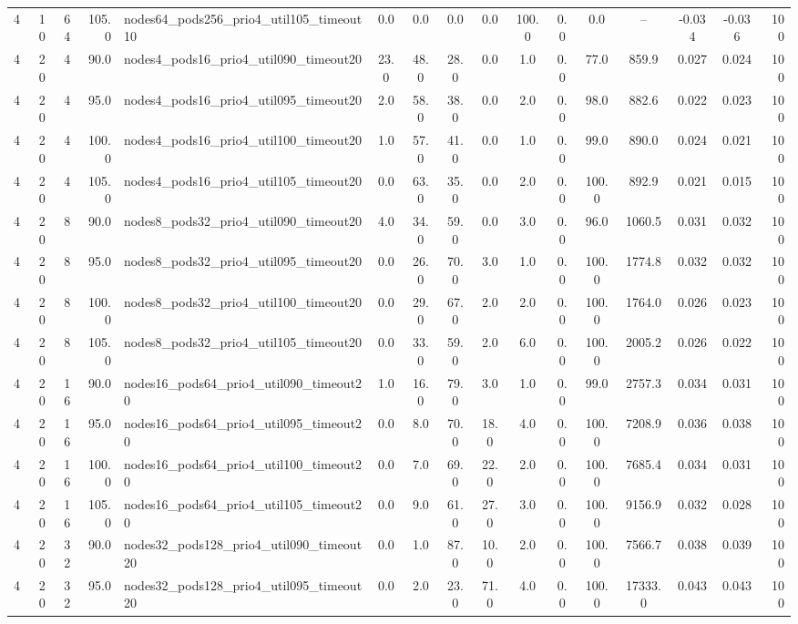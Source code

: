 \begin{tabular}{r r r r l c c c c c c c c c c r}
4 & 10 & 64 & 105.0 & nodes64\_pods256\_prio4\_util105\_timeout10 & 0.0 & 0.0 & 0.0 & 0.0 & 100.0 & 0.0 & 0.0 & -- & -0.034 & -0.036 & 100 \\
4 & 20 & 4 & 90.0 & nodes4\_pods16\_prio4\_util090\_timeout20 & 23.0 & 48.0 & 28.0 & 0.0 & 1.0 & 0.0 & 77.0 & 859.9 & 0.027 & 0.024 & 100 \\
4 & 20 & 4 & 95.0 & nodes4\_pods16\_prio4\_util095\_timeout20 & 2.0 & 58.0 & 38.0 & 0.0 & 2.0 & 0.0 & 98.0 & 882.6 & 0.022 & 0.023 & 100 \\
4 & 20 & 4 & 100.0 & nodes4\_pods16\_prio4\_util100\_timeout20 & 1.0 & 57.0 & 41.0 & 0.0 & 1.0 & 0.0 & 99.0 & 890.0 & 0.024 & 0.021 & 100 \\
4 & 20 & 4 & 105.0 & nodes4\_pods16\_prio4\_util105\_timeout20 & 0.0 & 63.0 & 35.0 & 0.0 & 2.0 & 0.0 & 100.0 & 892.9 & 0.021 & 0.015 & 100 \\
4 & 20 & 8 & 90.0 & nodes8\_pods32\_prio4\_util090\_timeout20 & 4.0 & 34.0 & 59.0 & 0.0 & 3.0 & 0.0 & 96.0 & 1060.5 & 0.031 & 0.032 & 100 \\
4 & 20 & 8 & 95.0 & nodes8\_pods32\_prio4\_util095\_timeout20 & 0.0 & 26.0 & 70.0 & 3.0 & 1.0 & 0.0 & 100.0 & 1774.8 & 0.032 & 0.032 & 100 \\
4 & 20 & 8 & 100.0 & nodes8\_pods32\_prio4\_util100\_timeout20 & 0.0 & 29.0 & 67.0 & 2.0 & 2.0 & 0.0 & 100.0 & 1764.0 & 0.026 & 0.023 & 100 \\
4 & 20 & 8 & 105.0 & nodes8\_pods32\_prio4\_util105\_timeout20 & 0.0 & 33.0 & 59.0 & 2.0 & 6.0 & 0.0 & 100.0 & 2005.2 & 0.026 & 0.022 & 100 \\
4 & 20 & 16 & 90.0 & nodes16\_pods64\_prio4\_util090\_timeout20 & 1.0 & 16.0 & 79.0 & 3.0 & 1.0 & 0.0 & 99.0 & 2757.3 & 0.034 & 0.031 & 100 \\
4 & 20 & 16 & 95.0 & nodes16\_pods64\_prio4\_util095\_timeout20 & 0.0 & 8.0 & 70.0 & 18.0 & 4.0 & 0.0 & 100.0 & 7208.9 & 0.036 & 0.038 & 100 \\
4 & 20 & 16 & 100.0 & nodes16\_pods64\_prio4\_util100\_timeout20 & 0.0 & 7.0 & 69.0 & 22.0 & 2.0 & 0.0 & 100.0 & 7685.4 & 0.034 & 0.031 & 100 \\
4 & 20 & 16 & 105.0 & nodes16\_pods64\_prio4\_util105\_timeout20 & 0.0 & 9.0 & 61.0 & 27.0 & 3.0 & 0.0 & 100.0 & 9156.9 & 0.032 & 0.028 & 100 \\
4 & 20 & 32 & 90.0 & nodes32\_pods128\_prio4\_util090\_timeout20 & 0.0 & 1.0 & 87.0 & 10.0 & 2.0 & 0.0 & 100.0 & 7566.7 & 0.038 & 0.039 & 100 \\
4 & 20 & 32 & 95.0 & nodes32\_pods128\_prio4\_util095\_timeout20 & 0.0 & 2.0 & 23.0 & 71.0 & 4.0 & 0.0 & 100.0 & 17333.0 & 0.043 & 0.043 & 100 \\

\end{tabular}
